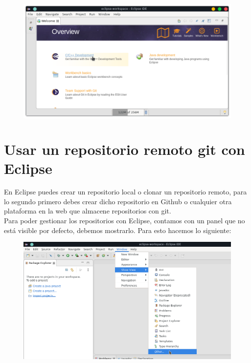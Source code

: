 \documentclass{article}
\begin{document}
\begin{figure}[h!]
  \centering
  \includegraphics[scale=0.75]{./Pictures/009_reiniciado.png}
\end{figure}

\newpage


\section*{Usar un repositorio remoto git con Eclipse}%
En Eclipse puedes crear un repositorio local o clonar un repositorio remoto,
para lo segundo primero debes crear dicho repositorio en Github o cualquier
otra plataforma en la web que almacene repositorios con git.\\

Para poder gestionar los repositorios con Eclipse, contamos con un panel que no
está visible por defecto, debemos mostrarlo. Para esto hacemos lo siguiente:

\begin{figure}[h!]
  \centering
  \includegraphics[scale=0.7]{./Pictures/010_other_git.png}
\end{figure}
\end{document}
